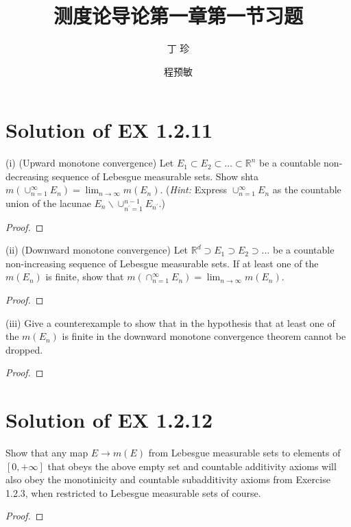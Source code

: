\documentclass[reqno,a4paper,14pt]{amsart}
\title{\textbf{测度论导论第一章第一节习题}}
\author{丁\;\;\; 珍}
\author{程预敏}
\begin{document}
\maketitle
\section{Solution of EX 1.2.11}
(i) (Upward monotone convergence) Let $E_1\subset E_2\subset \dots \subset \mathbb{R}^n$ be a countable non-decreasing sequence of Lebesgue measurable sets. Show shta $m(\cup_{n=1}^\infty E_n)=\lim_{n\to\infty} m(E_n)$. (\textit{Hint:} Express $\cup_{n=1}^\infty E_n$ as the countable union of the lacunae $E_n\backslash \cup_{n^\prime=1}^{n-1} E_{n^\prime}$.)
\begin{proof}
    
\end{proof}
(ii) (Downward monotone convergence) Let $\mathbb{R}^d \supset E_1 \supset E_2\supset \dots$ be a countable non-increasing sequence of Lebesgue measurable sets. If at least one of the $m(E_n)$ is finite, show that $m(\cap_{n=1}^\infty E_n)=\lim_{n\to \infty} m(E_n)$.
\begin{proof}
    
\end{proof}
(iii) Give a counterexample to show that in the hypothesis that at least one of the $m(E_n)$ is finite in the downward monotone convergence theorem cannot be dropped.
\begin{proof}
    
\end{proof}


\section{Solution of EX 1.2.12}
Show that any map $E\to m(E)$ from Lebesgue measurable sets to elements of $[0,+\infty]$ that obeys the above empty set and countable additivity axioms will also obey the monotinicity and countable subadditivity axioms from Exercise 1.2.3, when restricted to Lebesgue measurable sets of course.
\begin{proof}
    
\end{proof}
\end{document}
